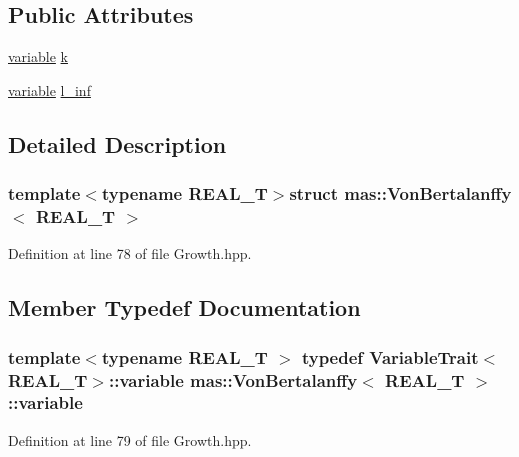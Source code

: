 \subsection*{Public Attributes}
\begin{DoxyCompactItemize}
\item 
\hyperlink{structmas_1_1_von_bertalanffy_a44edcdf23cc66a10c6744741588492b9}{variable} \hyperlink{structmas_1_1_von_bertalanffy_a6478a55daec32dd2e49104bda9207586}{k}
\item 
\hyperlink{structmas_1_1_von_bertalanffy_a44edcdf23cc66a10c6744741588492b9}{variable} \hyperlink{structmas_1_1_von_bertalanffy_a1c1c468cf32d014d16dcf8d9defccc46}{l\-\_\-inf}
\end{DoxyCompactItemize}


\subsection{Detailed Description}
\subsubsection*{template$<$typename R\-E\-A\-L\-\_\-\-T$>$struct mas\-::\-Von\-Bertalanffy$<$ R\-E\-A\-L\-\_\-\-T $>$}



Definition at line 78 of file Growth.\-hpp.



\subsection{Member Typedef Documentation}
\hypertarget{structmas_1_1_von_bertalanffy_a44edcdf23cc66a10c6744741588492b9}{
\subsubsection[{variable}]{\setlength{\rightskip}{0pt plus 5cm}template$<$typename R\-E\-A\-L\-\_\-\-T $>$ typedef {\bf Variable\-Trait}$<$R\-E\-A\-L\-\_\-\-T$>$\-::{\bf variable} {\bf mas\-::\-Von\-Bertalanffy}$<$ R\-E\-A\-L\-\_\-\-T $>$\-::{\bf variable}}}\label{structmas_1_1_von_bertalanffy_a44edcdf23cc66a10c6744741588492b9}


Definition at line 79 of file Growth.\-hpp.



